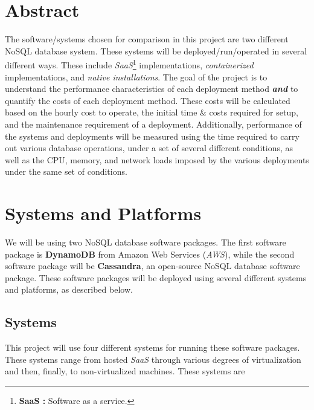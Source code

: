 \documentclass{article}[10pt]
\numberwithin{equation}{section}
\begin{document}
\begin{multicols}{2}
\begin{flushleft}


\section*{Abstract}
\begin{spacing}{1.5}
The software/systems chosen for comparison in this project are two different NoSQL database system.  These systems will be deployed/run/operated in several different ways.  These include \emph{SaaS}\footnote{\textbf{SaaS :} Software as a service.} implementations, \emph{containerized} implementations, and \emph{native installations}.  The goal of the project is to understand the performance characteristics of each deployment method \emph{\textbf{and}} to quantify the costs of each deployment method.  These costs will be calculated based on the hourly cost to operate, the initial time \& costs required for setup, and the maintenance requirement of a deployment.  Additionally, performance of the systems and deployments will be measured using the time required to carry out various database operations, under a set of several different conditions, as well as the CPU, memory, and network loads imposed by the various deployments under the same set of conditions.
\end{spacing}




\section{Systems and Platforms}
\begin{spacing}{1.5}
We will be using two NoSQL database software packages.  The first software package is \textbf{DynamoDB} from Amazon Web Services (\emph{AWS}), while the second software package will be \textbf{Cassandra}, an open-source NoSQL database software package.  These software packages will be deployed using several different systems and platforms, as described below.
\end{spacing}



\subsection{Systems}
\begin{spacing}{1.5}
This project will use four different systems for running these software packages.  These systems range from hosted \emph{SaaS} through various degrees of virtualization and then, finally, to non-virtualized machines.  These systems are 


\end{spacing}
\end{flushleft}
\end{multicols}
\end{document}
